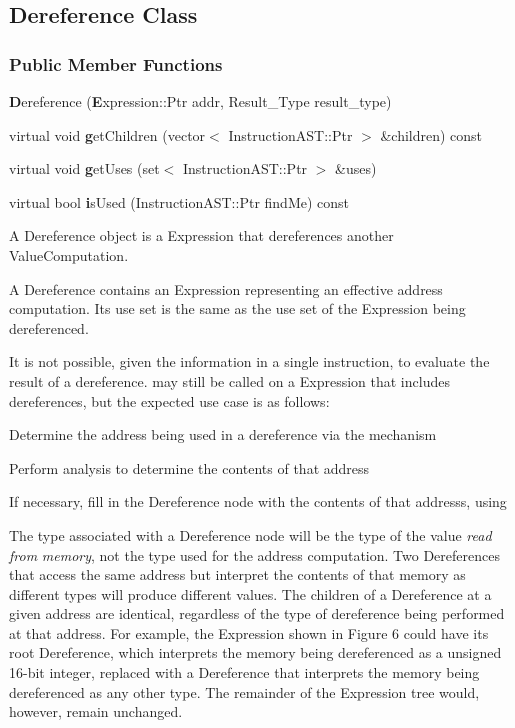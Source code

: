 \subsection{Dereference Class}

\subsubsection*{Public Member Functions}
\begin{DoxyCompactItemize}
\item 
{\textbf Dereference} ({\textbf Expression::Ptr} addr, Result\_\-Type result\_\-type)
\item 
virtual void {\textbf getChildren} (vector$<$ InstructionAST::Ptr $>$ \&children) const 
\item 
virtual void {\textbf getUses} (set$<$ InstructionAST::Ptr $>$ \&uses)
\item 
virtual bool {\textbf isUsed} (InstructionAST::Ptr findMe) const 
\end{DoxyCompactItemize}



A Dereference object is a Expression that dereferences another ValueComputation.

A Dereference contains an Expression representing an effective address computation. Its use set is the same as the use set of the Expression being dereferenced.

It is not possible, given the information in a single instruction, to evaluate the result of a dereference.  may still be called on a Expression that includes dereferences, but the expected use case is as follows:
\begin{DoxyItemize}
\item Determine the address being used in a dereference via the  mechanism
\item Perform analysis to determine the contents of that address
\item If necessary, fill in the Dereference node with the contents of that addresss, using  
\end{DoxyItemize}

The type associated with a Dereference node will be the type of the value {\itshape read\/} {\itshape from\/} {\itshape memory\/}, not the type used for the address computation. Two Dereferences that access the same address but interpret the contents of that memory as different types will produce different values. The children of a Dereference at a given address are identical, regardless of the type of dereference being performed at that address. For example, the Expression shown in Figure 6 could have its root Dereference, which interprets the memory being dereferenced as a unsigned 16-\/bit integer, replaced with a Dereference that interprets the memory being dereferenced as any other type. The remainder of the Expression tree would, however, remain unchanged. 

